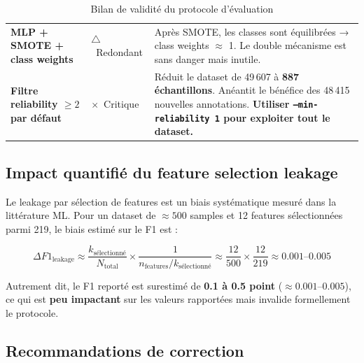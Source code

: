 \documentclass[11pt,a4paper]{article}
\newcommand{\param}[1]{\texttt{#1}}
\newcommand{\warn}{{\color{warnborder}$\triangle$}}
\newcommand{\fail}{{\color{dangerBorder}$\times$}}
\begin{document}
\begin{table}[h!]
\begin{tabular}{p{5.5cm}p{1.5cm}p{7cm}}
\textbf{MLP + SMOTE + class weights}
& \warn~Redondant
& Après SMOTE, les classes sont équilibrées → class weights $\approx$ 1.
  Le double mécanisme est sans danger mais inutile. \\

\textbf{Filtre reliability $\geq 2$ par défaut}
& \fail~Critique
& Réduit le dataset de 49\,607 à \textbf{887 échantillons}.
  Anéantit le bénéfice des 48\,415 nouvelles annotations.
  \textbf{Utiliser \param{--min-reliability 1} pour exploiter tout le dataset.} \\

\bottomrule
\end{tabular}
\caption{Bilan de validité du protocole d'évaluation}
\end{table}

\subsection{Impact quantifié du feature selection leakage}

Le leakage par sélection de features est un biais systématique mesuré
dans la littérature ML. Pour un dataset de $\approx500$ samples et 12 features
sélectionnées parmi 219, le biais estimé sur le F1 est :

\begin{equation}
\Delta F1_{\text{leakage}} \approx \frac{k_{\text{sélectionné}}}{N_{\text{total}}} \times
\frac{1}{n_{\text{features}} / k_{\text{sélectionné}}}
\approx \frac{12}{500} \times \frac{12}{219} \approx 0.001\text{--}0.005
\end{equation}

\noindent Autrement dit, le F1 reporté est surestimé de \textbf{0.1 à 0.5 point} ($\approx 0.001$--$0.005$),
ce qui est \textbf{peu impactant} sur les valeurs rapportées mais invalide formellement le protocole.

\subsection{Recommandations de correction}
\end{document}

